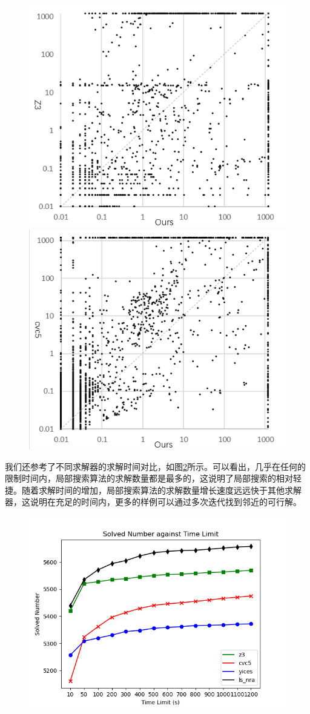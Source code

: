 \begin{figure}[t]
    \centering
    \includegraphics[width=0.45\columnwidth]{Img/scatter_z3b.png}\qquad
    \includegraphics[width=0.45\columnwidth]{Img/scatter_cvc5b.png}
\label{fig:scatter}
\end{figure}

我们还参考了不同求解器的求解时间对比，如图\ref{fig:time}所示。可以看出，几乎在任何的限制时间内，局部搜索算法的求解数量都是最多的，这说明了局部搜索的相对轻捷。随着求解时间的增加，局部搜索算法的求解数量增长速度远远快于其他求解器，这说明在充足的时间内，更多的样例可以通过多次迭代找到邻近的可行解。
\begin{figure}[t]
    \centering
    \includegraphics[width=\columnwidth]{Img/time_solver.png}
\label{fig:time}
\end{figure}


